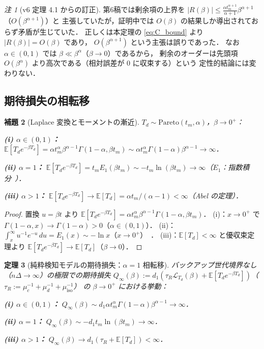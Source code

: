 \documentclass[12pt,a4paper]{article}
\theoremstyle{plain}
\newtheorem{theorem}{定理}[section]
\newtheorem{lemma}[theorem]{補題}
\theoremstyle{definition}
\theoremstyle{remark}
\newtheorem{remark}[theorem]{注}
\newcommand{\E}{\mathbb{E}}
\newcommand{\calL}{\mathcal{L}}
\newcommand{\Qinf}{Q_{\infty}}
\begin{document}
\begin{remark}[v6 定理 4.1 からの訂正]\label{rem:correction}
第6稿では剰余項の上界を $|R(\beta)|\le\frac{\alpha t_m^{\alpha+1}}{\alpha+1}\beta^{\alpha+1}$（$O(\beta^{\alpha+1})$）と
主張していたが，証明中では $O(\beta)$ の結果しか導出されておらず矛盾が生じていた．
正しくは本定理の \eqref{eq:C_bound} より $|R(\beta)|=O(\beta)$ であり，
$O(\beta^{\alpha+1})$ という主張は誤りであった．
なお $\alpha\in(0,1)$ では $\beta\ll\beta^\alpha$（$\beta\to0$）であるから，
剰余のオーダーは先頭項 $O(\beta^\alpha)$ より高次である（相対誤差が $0$ に収束する）という
定性的結論には変わりない．
\end{remark}

\subsection{期待損失の相転移}

\begin{lemma}[Laplace 変換とモーメントの漸近]\label{lem:laplace_moment}
$T_d\sim\mathrm{Pareto}(t_m,\alpha)$，$\beta\to0^+$：

\noindent\textbf{(i) $\alpha\in(0,1)$：}
$\E[T_d e^{-\beta T_d}]
=\alpha t_m^\alpha\beta^{\alpha-1}\Gamma(1-\alpha,\beta t_m)
\sim\alpha t_m^\alpha\Gamma(1-\alpha)\beta^{\alpha-1}\to\infty$．

\noindent\textbf{(ii) $\alpha=1$：}
$\E[T_d e^{-\beta T_d}]=t_m E_1(\beta t_m)\sim -t_m\ln(\beta t_m)\to\infty$（$E_1$：指数積分~\cite{abramowitz1965}）．

\noindent\textbf{(iii) $\alpha>1$：}
$\E[T_d e^{-\beta T_d}]\to\E[T_d]=\alpha t_m/(\alpha-1)<\infty$（Abel の定理）．
\end{lemma}

\begin{proof}
置換 $u=\beta t$ より $\E[T_d e^{-\beta T_d}]=\alpha t_m^\alpha\beta^{\alpha-1}\Gamma(1-\alpha,\beta t_m)$．
(i)：$x\to0^+$ で $\Gamma(1-\alpha,x)\to\Gamma(1-\alpha)>0$（$\alpha\in(0,1)$）．
(ii)：$\int_x^\infty u^{-1}e^{-u}\,du=E_1(x)\sim -\ln x$（$x\to0^+$）~\cite{abramowitz1965}．
(iii)：$\E[T_d]<\infty$ と優収束定理より $\E[T_d e^{-\beta T_d}]\to\E[T_d]$（$\beta\to0$）．
\end{proof}

\begin{theorem}[純粋検知モデルの期待損失：$\alpha=1$ 相転移]\label{thm:q_inf}
バックアップ世代境界なし（$n\Delta\to\infty$）の極限での期待損失
$\Qinf(\beta):=d_1(\tau_R\calL_{T_d}(\beta)+\E[T_d e^{-\beta T_d}])$（$\tau_R:=\mu_c^{-1}+\mu_d^{-1}+\mu_{\mathrm{iso}}^{-1}$）
の $\beta\to0^+$ における挙動：

\noindent\textbf{(i) $\alpha\in(0,1)$：}
$\Qinf(\beta)\sim d_1\alpha t_m^\alpha\Gamma(1-\alpha)\beta^{\alpha-1}\to\infty$．

\noindent\textbf{(ii) $\alpha=1$：}
$\Qinf(\beta)\sim -d_1 t_m\ln(\beta t_m)\to\infty$．

\noindent\textbf{(iii) $\alpha>1$：}
$\Qinf(\beta)\to d_1(\tau_R+\E[T_d])<\infty$．
\end{theorem}
\end{document}
